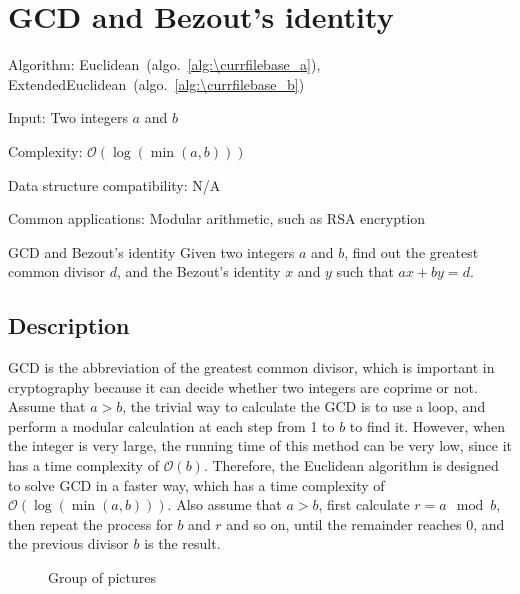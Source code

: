 \documentclass[catalog.tex]{subfiles}
\begin{document}
\def\pbname{GCD and Bezout’s identity} %

\section{\pbname} 

\begin{overview}
\item [Algorithm:] Euclidean~(algo.~\ref{alg:\currfilebase_a}), ExtendedEuclidean~(algo.~\ref{alg:\currfilebase_b})
\item [Input:] Two integers $a$ and $b$
\item [Complexity:] $\mathcal{O}(\log(\min(a, b)))$
\item [Data structure compatibility:] N/A
\item [Common applications:] Modular arithmetic, such as RSA encryption
\end{overview}


\begin{problem}{\pbname}
	Given two integers $a$ and $b$, find out the greatest common divisor $d$, and the Bezout's identity $x$ and $y$ such that $ax + by = d$.
\end{problem}


\subsection*{Description}
GCD is the abbreviation of the greatest common divisor, which is important in cryptography because it can decide whether two integers are coprime or not. Assume that $a > b$, the trivial way to calculate the GCD is to use a loop, and perform a modular calculation at each step from 1 to $b$ to find it. However, when the integer is very large, the running time of this method can be very low, since it has a time complexity of $\mathcal{O}(b)$. Therefore, the Euclidean algorithm is designed to solve GCD in a faster way, which has a time complexity of $\mathcal{O}(\log(\min(a, b)))$. Also assume that $a>b$, first calculate $r = a\mod b$, then repeat the process for $b$ and $r$ and so on, until the remainder reaches 0, and the previous divisor $b$ is the result.


\begin{figure}[!htb]
	\centering
	\hspace{2cm} %
	\caption{Group of pictures}
	\label{fig:\currfilebase_group}
\end{figure}
\end{document}
